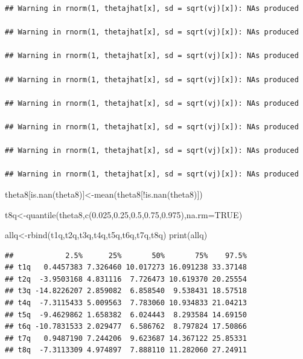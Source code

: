 \documentclass[
]{book}
\newenvironment{Shaded}{\begin{snugshade}}{\end{snugshade}}
\newcommand{\AttributeTok}[1]{\textcolor[rgb]{0.77,0.63,0.00}{#1}}
\newcommand{\ConstantTok}[1]{\textcolor[rgb]{0.00,0.00,0.00}{#1}}
\newcommand{\FloatTok}[1]{\textcolor[rgb]{0.00,0.00,0.81}{#1}}
\newcommand{\FunctionTok}[1]{\textcolor[rgb]{0.00,0.00,0.00}{#1}}
\newcommand{\NormalTok}[1]{#1}
\newcommand{\OtherTok}[1]{\textcolor[rgb]{0.56,0.35,0.01}{#1}}
\newcommand{\SpecialCharTok}[1]{\textcolor[rgb]{0.00,0.00,0.00}{#1}}
\theoremstyle{definition}
\theoremstyle{definition}
\theoremstyle{definition}
\theoremstyle{definition}
\theoremstyle{remark}
\begin{document}
\begin{verbatim}
## Warning in rnorm(1, thetajhat[x], sd = sqrt(vj)[x]): NAs produced

## Warning in rnorm(1, thetajhat[x], sd = sqrt(vj)[x]): NAs produced

## Warning in rnorm(1, thetajhat[x], sd = sqrt(vj)[x]): NAs produced

## Warning in rnorm(1, thetajhat[x], sd = sqrt(vj)[x]): NAs produced

## Warning in rnorm(1, thetajhat[x], sd = sqrt(vj)[x]): NAs produced

## Warning in rnorm(1, thetajhat[x], sd = sqrt(vj)[x]): NAs produced

## Warning in rnorm(1, thetajhat[x], sd = sqrt(vj)[x]): NAs produced

## Warning in rnorm(1, thetajhat[x], sd = sqrt(vj)[x]): NAs produced
\end{verbatim}

\begin{Shaded}
\begin{Highlighting}[]
\NormalTok{    theta8[}\FunctionTok{is.nan}\NormalTok{(theta8)]}\OtherTok{\textless{}{-}}\FunctionTok{mean}\NormalTok{(theta8[}\SpecialCharTok{!}\FunctionTok{is.nan}\NormalTok{(theta8)])}

\NormalTok{  t8q}\OtherTok{\textless{}{-}}\FunctionTok{quantile}\NormalTok{(theta8,}\FunctionTok{c}\NormalTok{(}\FloatTok{0.025}\NormalTok{,}\FloatTok{0.25}\NormalTok{,}\FloatTok{0.5}\NormalTok{,}\FloatTok{0.75}\NormalTok{,}\FloatTok{0.975}\NormalTok{),}\AttributeTok{na.rm=}\ConstantTok{TRUE}\NormalTok{)}

\NormalTok{ allq}\OtherTok{\textless{}{-}}\FunctionTok{rbind}\NormalTok{(t1q,t2q,t3q,t4q,t5q,t6q,t7q,t8q)}
 \FunctionTok{print}\NormalTok{(allq)}
\end{Highlighting}
\end{Shaded}

\begin{verbatim}
##            2.5%      25%       50%       75%    97.5%
## t1q   0.4457383 7.326460 10.017273 16.091238 33.37148
## t2q  -3.9503168 4.831116  7.726473 10.619370 20.25554
## t3q -14.8226207 2.859082  6.858540  9.538431 18.57518
## t4q  -7.3115433 5.009563  7.783060 10.934833 21.04213
## t5q  -9.4629862 1.658382  6.024443  8.293584 14.69150
## t6q -10.7831533 2.029477  6.586762  8.797824 17.50866
## t7q   0.9487190 7.244206  9.623687 14.367122 25.85331
## t8q  -7.3113309 4.974897  7.888110 11.282060 27.24911
\end{verbatim}
\end{document}
